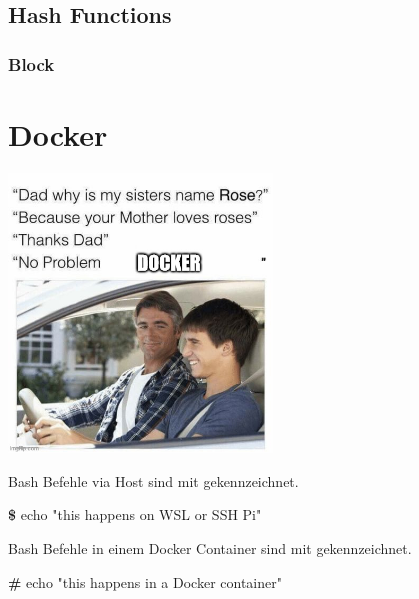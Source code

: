 \documentclass[
  10pt,
  a4paper,
  twocolumn]{article}
\newenvironment{Shaded}{}{}
\newcommand{\ExtensionTok}[1]{\textcolor[rgb]{0.84,0.23,0.29}{\textbf{#1}}}
\newcommand{\NormalTok}[1]{\textcolor[rgb]{0.14,0.16,0.18}{#1}}
\newcommand{\StringTok}[1]{\textcolor[rgb]{0.01,0.18,0.38}{#1}}
\begin{document}
\subsection{Hash Functions}\label{hash-functions}

\subsubsection{Block}\label{block}

\section{\texorpdfstring{Docker }{Docker }}\label{docker}

\begin{center}
\includegraphics[width=7cm,height=\textheight]{images/meme_docker.jpg}
\end{center}

\begin{tcolorbox}[enhanced jigsaw, opacitybacktitle=0.6, bottomrule=.15mm, toptitle=1mm, left=2mm, colbacktitle=quarto-callout-important-color!10!white, colframe=quarto-callout-important-color-frame, titlerule=0mm, colback=white, rightrule=.15mm, toprule=.15mm, coltitle=black, leftrule=.75mm, title=\textcolor{quarto-callout-important-color}{\faExclamation}\hspace{0.5em}{Wichtig}, breakable, bottomtitle=1mm, opacityback=0, arc=.35mm]

Bash Befehle via Host sind mit {\color{BrickRed}{\texttt{\textbf{\$}}}}
gekennzeichnet.

\begin{Shaded}
\begin{Highlighting}[]
\ExtensionTok{\$}\NormalTok{ echo }\StringTok{"this happens on WSL or SSH Pi"}
\end{Highlighting}
\end{Shaded}

Bash Befehle in einem Docker Container sind mit
{\color{BrickRed}{\texttt{\textbf{\#}}}} gekennzeichnet.

\begin{Shaded}
\begin{Highlighting}[]
\ExtensionTok{\#}\NormalTok{ echo }\StringTok{"this happens in a Docker container"}
\end{Highlighting}
\end{Shaded}

\end{tcolorbox}
\end{document}
